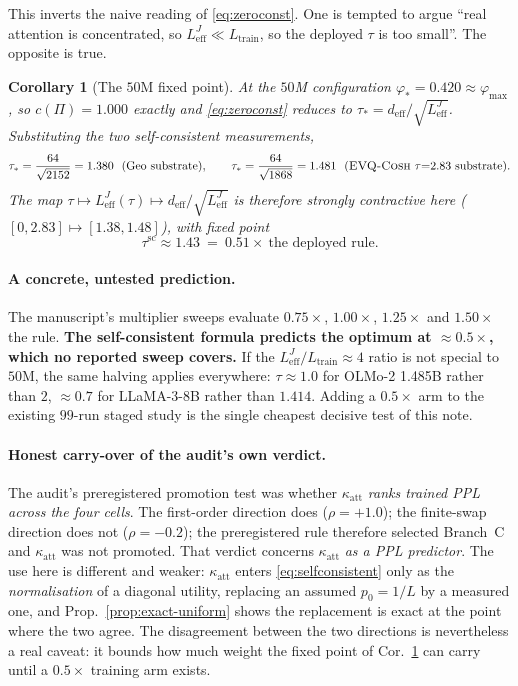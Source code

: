 \documentclass[11pt]{article}
\newtheorem{corollary}[theorem]{Corollary}
\theoremstyle{definition}
\newcommand{\evq}{\textsc{EVQ-Cosh}}
\newcommand{\deff}{d_{\mathrm{eff}}}
\newcommand{\Ltr}{L_{\mathrm{train}}}
\newcommand{\Leff}{L_{\mathrm{eff}}^{J}}
\begin{document}
This inverts the naive reading of \eqref{eq:zeroconst}. One is tempted to argue ``real attention is
concentrated, so $\Leff\ll\Ltr$, so the deployed $\tau$ is too small''. The opposite is true.

\begin{corollary}[The $50$M fixed point]\label{cor:fixedpoint}
At the $50$M configuration $\varphi_*=0.420\approx\varphi_{\max}$, so $c(\Pi)=1.000$ exactly and
\eqref{eq:zeroconst} reduces to $\tau_*=\deff/\sqrt{\Leff}$. Substituting the two self-consistent
measurements,
\[
\tau_*=\frac{64}{\sqrt{2152}}=1.380\ \ (\text{Geo substrate}),\qquad
\tau_*=\frac{64}{\sqrt{1868}}=1.481\ \ (\evq{}\ \tau{=}2.83\ \text{substrate}).
\]
The map $\tau\mapsto\Leff(\tau)\mapsto\deff/\sqrt{\Leff}$ is therefore strongly contractive here
($[0,2.83]\mapsto[1.38,1.48]$), with fixed point
\[
\boxed{\ \tau^{\mathrm{sc}}\approx1.43\ =\ 0.51\times\ \text{the deployed rule}.\ }
\]
\end{corollary}

\paragraph{A concrete, untested prediction.} The manuscript's multiplier sweeps evaluate
$0.75\times$, $1.00\times$, $1.25\times$ and $1.50\times$ the rule. \textbf{The self-consistent
formula predicts the optimum at $\approx0.5\times$, which no reported sweep covers.} If the
$\Leff/\Ltr\approx4$ ratio is not special to $50$M, the same halving applies everywhere:
$\tau\approx1.0$ for OLMo-2 1.485B rather than $2$, $\approx0.7$ for LLaMA-3-8B rather than
$1.414$. Adding a $0.5\times$ arm to the existing $99$-run staged study is the single cheapest
decisive test of this note.

\paragraph{Honest carry-over of the audit's own verdict.} The audit's preregistered promotion test
was whether $\kappa_{\mathrm{att}}$ \emph{ranks trained PPL across the four cells}. The first-order
direction does ($\rho{=}{+}1.0$); the finite-swap direction does not ($\rho{=}{-}0.2$); the
preregistered rule therefore selected Branch~C and $\kappa_{\mathrm{att}}$ was not promoted. That
verdict concerns $\kappa_{\mathrm{att}}$ \emph{as a PPL predictor}. The use here is different and
weaker: $\kappa_{\mathrm{att}}$ enters \eqref{eq:selfconsistent} only as the \emph{normalisation}
of a diagonal utility, replacing an assumed $p_0{=}1/L$ by a measured one, and
Prop.~\ref{prop:exact-uniform} shows the replacement is exact at the point where the two agree.
The disagreement between the two directions is nevertheless a real caveat: it bounds how much
weight the fixed point of Cor.~\ref{cor:fixedpoint} can carry until a $0.5\times$ training arm
exists.
\end{document}
